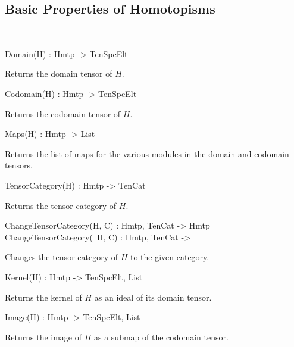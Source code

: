 \subsection{Basic Properties of Homotopisms}~

\begin{intrinsics}
Domain(H) : Hmtp -> TenSpcElt
\end{intrinsics}

Returns the domain tensor of $H$.

\begin{intrinsics}
Codomain(H) : Hmtp -> TenSpcElt
\end{intrinsics}

Returns the codomain tensor of $H$.

\begin{intrinsics}
Maps(H) : Hmtp -> List
\end{intrinsics}

Returns the list of maps for the various modules in the domain and codomain 
tensors.

\begin{intrinsics}
TensorCategory(H) : Hmtp -> TenCat
\end{intrinsics}

Returns the tensor category of $H$.

\begin{intrinsics}
ChangeTensorCategory(H, C) : Hmtp, TenCat -> Hmtp
ChangeTensorCategory(~H, C) : Hmtp, TenCat -> 
\end{intrinsics}

Changes the tensor category of $H$ to the given category.

\begin{intrinsics}
Kernel(H) : Hmtp -> TenSpcElt, List
\end{intrinsics}

Returns the kernel of $H$ as an ideal of its domain tensor.

\begin{intrinsics}
Image(H) : Hmtp -> TenSpcElt, List
\end{intrinsics}

Returns the image of $H$ as a submap of the codomain tensor.

